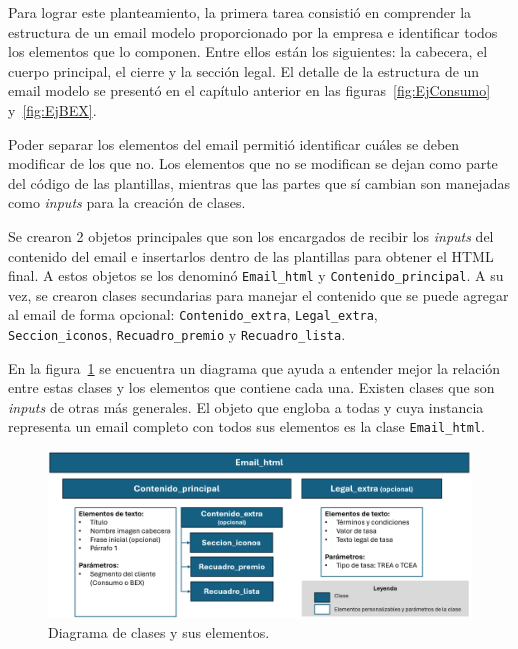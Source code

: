 Para lograr este planteamiento, la primera tarea consistió en comprender la estructura de un email modelo proporcionado por la empresa e identificar todos los elementos que lo componen. Entre ellos están los siguientes: la cabecera, el cuerpo principal, el cierre y la sección legal. El detalle de la estructura de un email modelo se presentó en el capítulo anterior en las figuras~\ref{fig:EjConsumo} y~\ref{fig:EjBEX}.

Poder separar los elementos del email permitió identificar cuáles se deben modificar de los que no. Los elementos que no se modifican se dejan como parte del código de las plantillas, mientras que las partes que sí cambian son manejadas como \textit{inputs} para la creación de clases. 

Se crearon 2 objetos principales que son los encargados de recibir los \textit{inputs} del contenido del email e insertarlos dentro de las plantillas para obtener el HTML final. A estos objetos se los denominó \texttt{Email\_html} y \texttt{Contenido\_principal}. A su vez, se crearon clases secundarias para manejar el contenido que se puede agregar al email de forma opcional: \texttt{Contenido\_extra}, \texttt{Legal\_extra}, \\ \texttt{Seccion\_iconos}, \texttt{Recuadro\_premio} y \texttt{Recuadro\_lista}.

En la figura~\ref{fig:Diagrama_clases} se encuentra un diagrama que ayuda a entender mejor la relación entre estas clases y los elementos que contiene cada una. Existen clases que son \textit{inputs} de otras más generales. El objeto que engloba a todas y cuya instancia representa un email completo con todos sus elementos es la clase \texttt{Email\_html}. 


\begin{figure}[!htpb]
    \centering
    \includegraphics[width=0.95\linewidth]{Figures/Diagrama_clases.png}
    \caption{Diagrama de clases y sus elementos.}
    \label{fig:Diagrama_clases}
\end{figure}

